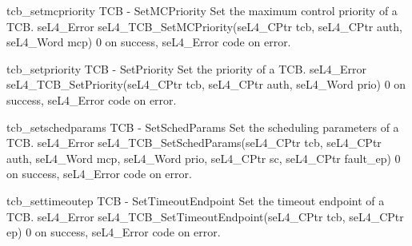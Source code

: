 \apidoc
{tcb_setmcpriority}
{TCB - SetMCPriority}
{Set the maximum control priority of a TCB.}
{seL4\_Error seL4\_TCB\_SetMCPriority(seL4\_CPtr tcb, seL4\_CPtr auth, seL4\_Word mcp)}
{
}
{0 on success, seL4\_Error code on error.}

\apidoc
{tcb_setpriority}
{TCB - SetPriority}
{Set the priority of a TCB.}
{seL4\_Error seL4\_TCB\_SetPriority(seL4\_CPtr tcb, seL4\_CPtr auth, seL4\_Word prio)}
{
}
{0 on success, seL4\_Error code on error.}

\apidoc
{tcb_setschedparams}
{TCB - SetSchedParams}
{Set the scheduling parameters of a TCB.}
{seL4\_Error seL4\_TCB\_SetSchedParams(seL4\_CPtr tcb, seL4\_CPtr auth, seL4\_Word mcp,
                                       seL4\_Word prio, seL4\_CPtr sc, seL4\_CPtr fault\_ep)}
{
}
{0 on success, seL4\_Error code on error.}

\apidoc
{tcb_settimeoutep}
{TCB - SetTimeoutEndpoint}
{Set the timeout endpoint of a TCB.}
{seL4\_Error seL4\_TCB\_SetTimeoutEndpoint(seL4\_CPtr tcb, seL4\_CPtr ep)}
{
}
{0 on success, seL4\_Error code on error.}

